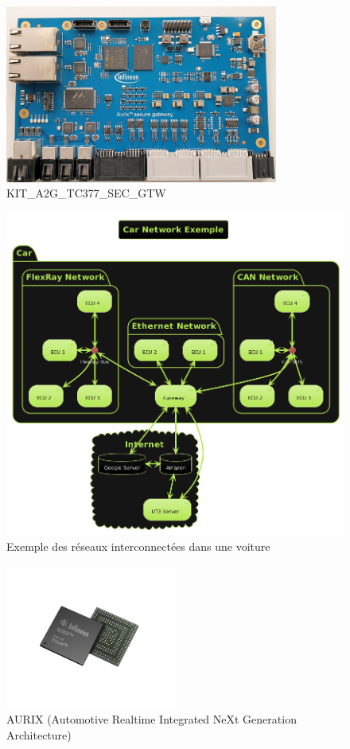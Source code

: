 \begin{figure}[!htb]
 \centering
 \includegraphics[width=0.8\textwidth]{img/secure-gateway.jpg}
 \caption{KIT\_A2G\_TC377\_SEC\_GTW}
 \label{fig:gw-photo}
\end{figure}

\begin{figure}[!htb]
 \centering
 \includegraphics[width=\textwidth]{img/gateway_car.png}
 \caption{Exemple des réseaux interconnect\'ees dans une voiture}
 \label{fig:gw-car}
\end{figure}

\begin{figure}[!htb]
 \centering
 \includegraphics[width=0.5\textwidth]{img/Aurix.png}
 \caption{AURIX (Automotive Realtime Integrated NeXt Generation Architecture)}
 \label{fig:aurix-photo}
\end{figure}

